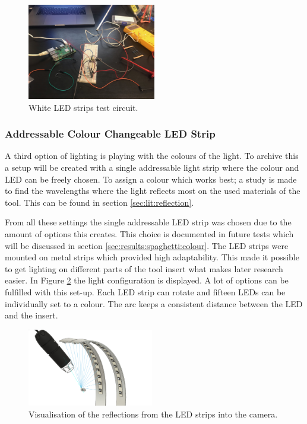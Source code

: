 		\begin{figure}[hbtp]
			\centering
			\includegraphics[width=0.5\textwidth, keepaspectratio=true]{./fig/Camera_setup/Light/White_Led_Strips/Test_setup_ledstrip.jpeg}
			\caption{White LED strips test circuit.}
			\label{fig:setup:whiteled:circuit}
		\end{figure}

	\subsubsection{Addressable Colour Changeable LED Strip}
	\label{sec:impl:camerasetup:light:ledstrips}

		A third option of lighting is playing with the colours of the light. To archive this a setup will be created with a single addressable light strip where the colour and LED can be freely chosen. 
		To assign a colour which works best; a study is made to find the wavelengths where the light reflects most on the used materials of the tool. This can be found in section \ref{sec:lit:reflection}.

From all these settings the single addressable LED strip was chosen due to the amount of options this creates. This choice is documented in future tests which will be discussed in section \ref{sec:results:spaghetti:colour}. The LED strips were mounted on metal strips which provided high adaptability. This made it possible to get lighting on different parts of the tool insert what makes later research easier. In Figure \ref{fig:impl:camerasetup:adressablestrips:reflection} the light configuration is displayed. A lot of options can be fulfilled with this set-up. Each LED strip can rotate and fifteen LEDs can be individually set to a colour. The arc keeps a consistent distance between the LED and the insert. 
	
	\begin{figure}[hbtp]
		\centering
		\includegraphics[width=0.49\textwidth]{fig/Camera_setup/adressable_ledstrip/ledstrips v13 close up with reflection.png}
		\caption{Visualisation of the reflections from the LED strips into the camera.}
		\label{fig:impl:camerasetup:adressablestrips:reflection}
	\end{figure}
	

